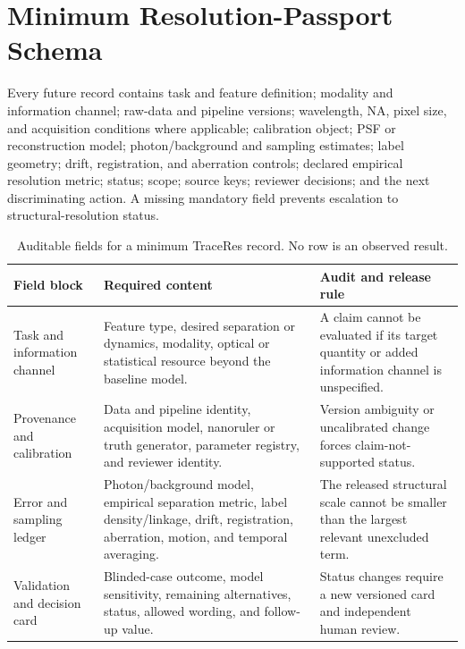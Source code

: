 \documentclass[conference]{IEEEtran}
\begin{document}
\appendices

\section{Minimum Resolution-Passport Schema}

Every future record contains task and feature definition; modality and information channel; raw-data and pipeline versions; wavelength, NA, pixel size, and acquisition conditions where applicable; calibration object; PSF or reconstruction model; photon/background and sampling estimates; label geometry; drift, registration, and aberration controls; declared empirical resolution metric; status; scope; source keys; reviewer decisions; and the next discriminating action. A missing mandatory field prevents escalation to structural-resolution status.

\begin{table}[t]
\caption{Auditable fields for a minimum TraceRes record. No row is an observed result.}
\label{tab:passport-schema}
\centering
\footnotesize
\setlength{\tabcolsep}{3pt}
\begin{tabular}{p{} p{} p{}}
\hline
\textbf{Field block} & \textbf{Required content} & \textbf{Audit and release rule}\\
\hline
Task and information channel & Feature type, desired separation or dynamics, modality, optical or statistical resource beyond the baseline model. & A claim cannot be evaluated if its target quantity or added information channel is unspecified.\\
Provenance and calibration & Data and pipeline identity, acquisition model, nanoruler or truth generator, parameter registry, and reviewer identity. & Version ambiguity or uncalibrated change forces claim-not-supported status.\\
Error and sampling ledger & Photon/background model, empirical separation metric, label density/linkage, drift, registration, aberration, motion, and temporal averaging. & The released structural scale cannot be smaller than the largest relevant unexcluded term.\\
Validation and decision card & Blinded-case outcome, model sensitivity, remaining alternatives, status, allowed wording, and follow-up value. & Status changes require a new versioned card and independent human review.\\
\hline
\end{tabular}
\end{table}
\end{document}
